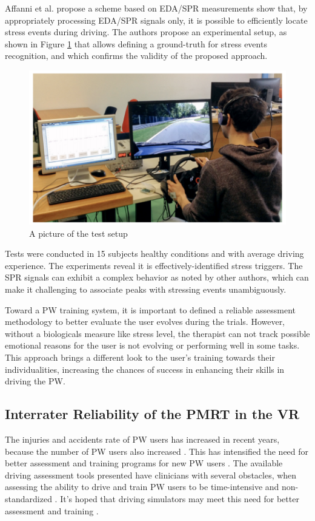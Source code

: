 Affanni et al. \cite{affanni2018}  propose a scheme based on EDA/SPR measurements show that, by appropriately processing EDA/SPR signals only, it is possible to efficiently locate stress events during driving. The authors propose an experimental setup, as shown in Figure \ref{fig:affanni2018} that allows defining a ground-truth for stress events recognition, and which confirms the validity of the proposed approach. 

\begin{figure}[!hbt]
\begin{center}
\includegraphics[width=1 \textwidth]{img/cap3/affani2018}
\caption{A picture of the test setup \cite{affanni2018}}
\label{fig:affanni2018}
\end{center}
\end{figure}

Tests were conducted in 15 subjects healthy conditions and with average driving experience. The experiments reveal it is effectively-identified stress triggers. The SPR signals can exhibit a complex behavior as noted by other authors,  which can make it challenging to associate peaks with stressing events unambiguously.

Toward a PW training system, it is important to defined a reliable assessment methodology to better evaluate the user evolves during the trials. However, without a biologicals measure like stress level, the therapist can not track possible emotional reasons for the user is not evolving or performing well in some tasks.  This approach brings a different look to the user's training towards their individualities, increasing the chances of success in enhancing their skills in driving the PW. 


\subsection{Interrater Reliability of the PMRT in the VR}
\label{sec:pmrtICC}
The injuries and accidents rate of PW users has increased in recent years, because the number of PW users also increased \cite{worobey2012}. This has intensified the need for better assessment and training programs for new PW users \cite{kirby2015}. The available driving assessment tools presented have clinicians with several obstacles, when assessing the ability to drive and train PW users to be time-intensive and non-standardized \cite{corfman2003}. It's hoped that driving simulators may meet this need for better assessment and training \cite{hogan2009}.


